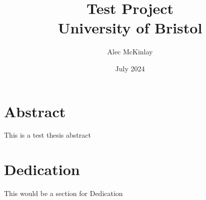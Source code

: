 \documentclass{report} %
\title{Test Project\\
{\Large University of Bristol}}
\author{Alec McKinlay}
\date{July 2024}
\begin{document}
\maketitle

\chapter*{Abstract}
This is a test thesis abstract

\chapter*{Dedication}
This would be a section for Dedication

\tableofcontents




\appendix


\end{document}

